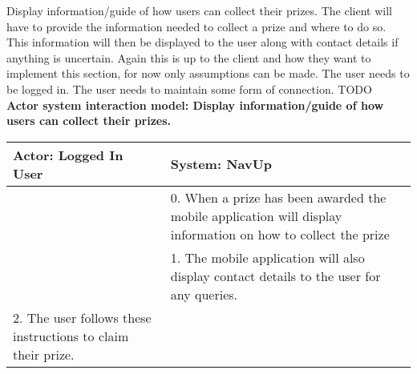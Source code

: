 \FuncReq
{Display information/guide of how users can collect their prizes.}
{The client will have to provide the information needed to collect a prize and where to do so. This information will then be displayed to the user along with contact details if anything is uncertain. Again this is up to the client and how they want to implement this section, for now only assumptions can be made.}
{The user needs to be logged in.
The user needs to maintain some form of connection.}
{TODO}
\\
\textbf{Actor system interaction model: Display information/guide of how users can collect their prizes.}\\
\begin{tabular}{ | p{6cm} | p{6cm} |}
\hline
Actor: Logged In User & System: NavUp \\ \hline
& 0. When a prize has been awarded the mobile application will display information on how to collect the prize\\ \hline
& 1. The mobile application will also display contact details to the user for any queries.\\ \hline
2. The user follows these instructions to claim their prize. &\\ \hline
\end{tabular}
\\
\bigskip